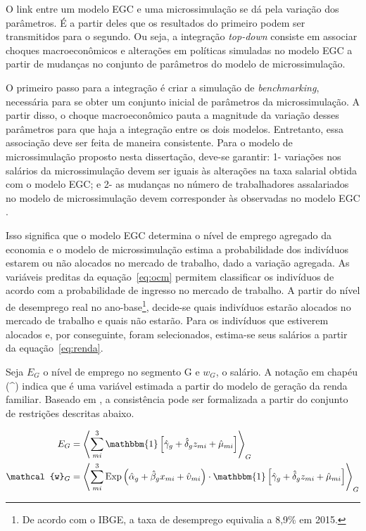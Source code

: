 O link entre um modelo EGC e uma microssimulação se dá pela variação dos parâmetros. É a partir deles que os resultados do primeiro podem ser transmitidos para o segundo. Ou seja, a integração \textit{top-down} consiste em associar choques macroeconômicos e alterações em políticas simuladas no modelo EGC a partir de mudanças no conjunto de parâmetros do modelo de microssimulação.

O primeiro passo para a integração é criar a simulação de \textit{benchmarking}, necessária para se obter um conjunto inicial de parâmetros da microssimulação. A partir disso, o choque macroeconômico pauta a magnitude da variação desses parâmetros para que haja a integração entre os dois modelos. Entretanto, essa associação deve ser feita de maneira consistente. Para o modelo de microssimulação proposto nesta dissertação, deve-se garantir: 1- variações nos salários da microssimulação devem ser iguais às alterações na taxa salarial obtida com o modelo EGC; e 2- as mudanças no número de trabalhadores assalariados no modelo de microssimulação devem corresponder às observadas no modelo EGC \cite{bourguignon05, colombo08}.

Isso significa que o modelo EGC determina o nível de emprego agregado da economia e o modelo de microssimulação estima a probabilidade dos indivíduos estarem ou não alocados no mercado de trabalho, dado a variação agregada. As variáveis preditas da equação~\eqref{eq:ocm} permitem classificar os indivíduos de acordo com a probabilidade de ingresso no mercado de trabalho. A partir do nível de desemprego real no ano-base\footnote{De acordo com o IBGE, a taxa de desemprego equivalia a 8,9\% em 2015.}, decide-se quais indivíduos estarão alocados no mercado de trabalho e quais não estarão. Para os indivíduos que estiverem alocados e, por conseguinte, foram selecionados, estima-se seus salários a partir da equação~\eqref{eq:renda}.

Seja $E_G$ o nível de emprego no segmento G e $w_G$, o salário. A notação em chapéu (\^{}) indica que é uma variável estimada a partir do modelo de geração da renda familiar. Baseado em \textcite{bourguignon05}, a consistência pode ser formalizada a partir do conjunto de restrições descritas abaixo.

\begin{align}
	E_G &= \left\langle \sum_{mi}^{3} \mathbbm{1} \left[ \hat{\gamma}_g + \hat{\delta}_g z_{mi} + \hat{\mu}_{mi} \right] \right\rangle_{G} \label{eq:emprego_ag} \\
	\mathcal{w}_G &= \left\langle \sum_{mi}^{3} \text{Exp} \left( \hat{\alpha}_g + \hat{\beta}_g x_{mi} + \hat{\upsilon}_{mi} \right) \cdot \mathbbm{1} \left[ \hat{\gamma}_g + \hat{\delta}_g z_{mi} + \hat{\mu}_{mi} \right] \right\rangle_{G} \label{eq:renda_ag}
\end{align}

